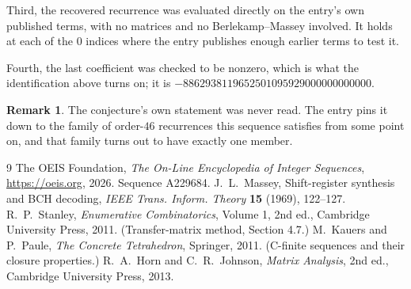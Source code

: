 \documentclass[11pt,a4paper]{article}
\theoremstyle{plain}
\theoremstyle{definition}
\newtheorem{remark}[theorem]{Remark}
\begin{document}
Third, the recovered recurrence was evaluated directly on the entry's own published terms, with
no matrices and no Berlekamp--Massey involved. It holds at each of the $0$ indices where
the entry publishes enough earlier terms to test it.

Fourth, the last coefficient was checked to be nonzero, which is what the identification above
turns on; it is $-8862938119652501095929000000000000$.

\begin{remark}
The conjecture's own statement was never read. The entry pins it down to the family of
order-$46$ recurrences this sequence satisfies from some point on, and that family turns
out to have exactly one member.
\end{remark}

\begin{thebibliography}{9}
 The OEIS Foundation, \emph{The On-Line Encyclopedia of Integer
Sequences}, \url{https://oeis.org}, 2026. Sequence A229684.
 J.~L.~Massey, Shift-register synthesis and BCH decoding, \emph{IEEE
Trans. Inform. Theory} \textbf{15} (1969), 122--127.
 R.~P.~Stanley, \emph{Enumerative Combinatorics}, Volume 1, 2nd ed.,
Cambridge University Press, 2011. (Transfer-matrix method, Section 4.7.)
 M.~Kauers and P.~Paule, \emph{The Concrete Tetrahedron}, Springer, 2011.
(C-finite sequences and their closure properties.)
 R.~A.~Horn and C.~R.~Johnson, \emph{Matrix Analysis}, 2nd ed., Cambridge
University Press, 2013.
\end{thebibliography}
\end{document}
